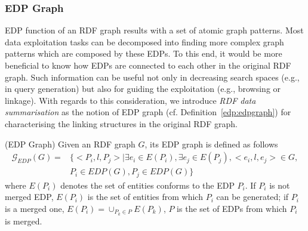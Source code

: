 \subsubsection{EDP Graph}
EDP function of an RDF graph results with a set of atomic graph patterns. Most data exploitation tasks can be decomposed into finding more complex graph patterns which are composed by these EDPs. To this end, it would be more beneficial to know how EDPs are connected to each other in the original RDF graph. Such information can be useful not only in decreasing search spaces (e.g., in query generation) but also for guiding the exploitation (e.g., browsing or linkage). With regards to this consideration, we introduce \emph{RDF data summarisation} as the notion of EDP graph (cf. Definition~\ref{edp:edpgraph}) for characterising the linking structures in the original RDF graph.
\vspace{-1ex}
\begin{definition} 
\label{edp:edpgraph} (EDP Graph) Given an RDF graph $G$, its EDP graph is defined as follows
\begin{equation}
\begin{split}
\mathcal{G}_{EDP}(G)= & 
\{<P_i,l,P_j>|\exists e_i \in E(P_i ), \exists e_j \in E(P_j ),<e_i,l,e_j> \in G, \\ 
& P_i \in EDP(G),P_j \in EDP(G) \}
\end{split}
\end{equation}
where $E(P_i)$ denotes the set of entities conforms to the EDP $P_i$. If $P_i$ is not merged EDP, $E(P_i)$ is the set of entities from which $P_i$ can be generated; if $P_i$  is a merged one, $E(P_i )=\cup_{P_k \in P}{E(P_k)}$, $P$ is the set of EDPs from which $P_i$  is merged.
\end{definition}

